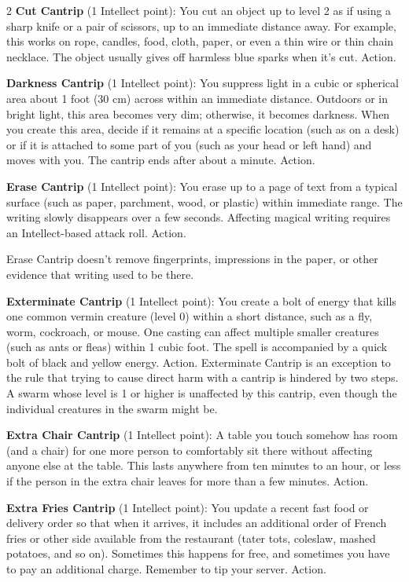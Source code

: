 \begin{multicols}{2}
\textbf{Cut Cantrip} (1 Intellect point): You cut an object up to level 2 as if using a sharp knife or a pair of scissors, up to an immediate distance away. For example, this works on rope, candles, food, cloth, paper, or even a thin wire or thin chain necklace. The object usually gives off harmless blue sparks when it’s cut. Action. 

\textbf{Darkness Cantrip} (1 Intellect point): You suppress light in a cubic or spherical area about 1 foot (30 cm) across within an immediate distance. Outdoors or in bright light, this area becomes very dim; otherwise, it becomes darkness. When you create this area, decide if it remains at a specific location (such as on a desk) or if it is attached to some part of you (such as your head or left hand) and moves with you. The cantrip ends after about a minute. Action. 

\textbf{Erase Cantrip} (1 Intellect point): You erase up to a page of text from a typical surface (such as paper, parchment, wood, or plastic) within immediate range. The writing slowly disappears over a few seconds. Affecting magical writing requires an Intellect-based attack roll. Action. 

Erase Cantrip doesn’t remove fingerprints, impressions in the paper, or other evidence that writing used to be there.

\textbf{Exterminate Cantrip} (1 Intellect point): You create a bolt of energy that kills one common vermin creature (level 0) within a short distance, such as a fly, worm, cockroach, or mouse. One casting can affect multiple smaller creatures (such as ants or fleas) within 1 cubic foot. The spell is accompanied by a quick bolt of black and yellow energy. Action. 
Exterminate Cantrip is an exception to the rule that trying to cause direct harm with a cantrip is hindered by two steps. A swarm whose level is 1 or higher is unaffected by this cantrip, even though the individual creatures in the swarm might be.

\textbf{Extra Chair Cantrip} (1 Intellect point): A table you touch somehow has room (and a chair) for one more person to comfortably sit there without affecting anyone else at the table. This lasts anywhere from ten minutes to an hour, or less if the person in the extra chair leaves for more than a few minutes. Action. 

\textbf{Extra Fries Cantrip} (1 Intellect point): You update a recent fast food or delivery order so that when it arrives, it includes an additional order of French fries or other side available from the restaurant (tater tots, coleslaw, mashed potatoes, and so on). Sometimes this happens for free, and sometimes you have to pay an additional charge. Remember to tip your server. Action. 


\end{multicols}
